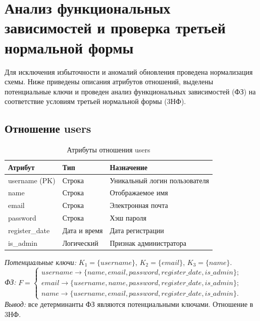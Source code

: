 \section{Анализ функциональных зависимостей и проверка третьей нормальной формы}

Для исключения избыточности и аномалий обновления проведена нормализация схемы. Ниже приведены описания атрибутов отношений, выделены потенциальные ключи и проведен анализ функциональных зависимостей (ФЗ) на соответствие условиям третьей нормальной формы (3НФ).

\subsection*{Отношение users}

\begin{table}[H]
	\centering
	\caption{Атрибуты отношения users}
	\label{tab:users}
	\begin{tabularx}{\textwidth}{|l|l|X|}
		\hline
		\textbf{Атрибут} & \textbf{Тип} & \textbf{Назначение} \\
		\hline
		username (PK) & Строка & Уникальный логин пользователя \\
		\hline
		name & Строка & Отображаемое имя \\
		\hline
		email & Строка & Электронная почта \\
		\hline
		password & Строка & Хэш пароля \\
		\hline
		register\_date & Дата и время & Дата регистрации \\
		\hline
		is\_admin & Логический & Признак администратора \\
		\hline
	\end{tabularx}
\end{table}

\textit{Потенциальные ключи:} $K_1 = \{username\}$, $K_2 = \{email\}$, $K_3 = \{name\}$. \\
\textit{ФЗ:} $F = \left\{ \begin{array}{l}
	username \rightarrow \{name, email, password, register\_date, is\_admin\}; \\
	email \rightarrow \{username, name, password, register\_date, is\_admin\}; \\
	name \rightarrow \{username, email, password, register\_date, is\_admin\}.
\end{array} \right.$ \\
\textit{Вывод:} все детерминанты ФЗ являются потенциальными ключами. Отношение в 3НФ.

